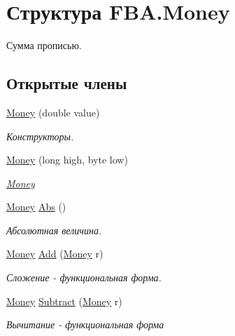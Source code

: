 \hypertarget{struct_f_b_a_1_1_money}{}\section{Структура F\+B\+A.\+Money}
\label{struct_f_b_a_1_1_money}


Сумма прописью.  


\subsection*{Открытые члены}
\begin{DoxyCompactItemize}
\item 
\mbox{\hyperlink{struct_f_b_a_1_1_money_a72bac273f301e8fb0ff3d365ce1b3791}{Money}} (double value)
\begin{DoxyCompactList}\small\item\em Конструкторы. \end{DoxyCompactList}\item 
\mbox{\hyperlink{struct_f_b_a_1_1_money_ad63c0cd25c5167ffa0d50c7f329bc5b9}{Money}} (long high, byte low)
\begin{DoxyCompactList}\small\item\em \mbox{\hyperlink{struct_f_b_a_1_1_money}{Money}} \end{DoxyCompactList}\item 
\mbox{\hyperlink{struct_f_b_a_1_1_money}{Money}} \mbox{\hyperlink{struct_f_b_a_1_1_money_a293be80e88859bd09a3071cbf3264304}{Abs}} ()
\begin{DoxyCompactList}\small\item\em Абсолютная величина. ~\newline
\end{DoxyCompactList}\item 
\mbox{\hyperlink{struct_f_b_a_1_1_money}{Money}} \mbox{\hyperlink{struct_f_b_a_1_1_money_ae2c24b55b6e82bbe7255488a77d321c5}{Add}} (\mbox{\hyperlink{struct_f_b_a_1_1_money}{Money}} r)
\begin{DoxyCompactList}\small\item\em Сложение -\/ функциональная форма. ~\newline
\end{DoxyCompactList}\item 
\mbox{\hyperlink{struct_f_b_a_1_1_money}{Money}} \mbox{\hyperlink{struct_f_b_a_1_1_money_a14ede4348ed7b119c195073a1e30ae11}{Subtract}} (\mbox{\hyperlink{struct_f_b_a_1_1_money}{Money}} r)
\begin{DoxyCompactList}\small\item\em Вычитание -\/ функциональная форма \end{DoxyCompactList}\item 

\end{DoxyCompactItemize}

